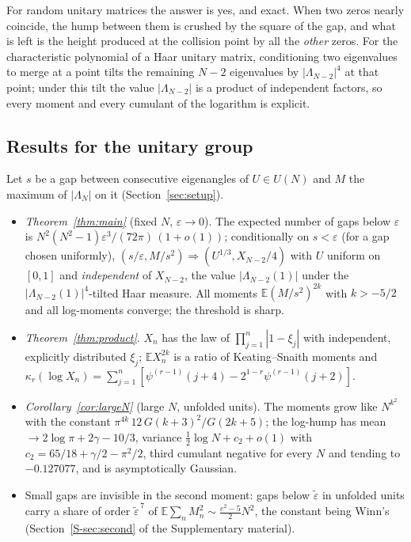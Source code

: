 \documentclass[12pt]{amsart}
\theoremstyle{remark}
\newcommand{\E}{\mathbb{E}}
\newcommand{\eps}{\varepsilon}
\newcommand{\1}{\mathbf{1}}
\begin{document}
For random unitary matrices the answer is yes, and exact. When two zeros
nearly coincide, the hump between them is crushed by the square of the
gap, and what is left is the height produced at the collision point by all
the \emph{other} zeros. For the characteristic polynomial of a Haar
unitary matrix, conditioning two eigenvalues to merge at a point tilts the
remaining $N-2$ eigenvalues by $|\Lambda_{N-2}|^4$ at that point; under
this tilt the value $|\Lambda_{N-2}|$ is a product of independent factors,
so every moment and every cumulant of the logarithm is explicit.

\subsection*{Results for the unitary group}
Let $s$ be a gap between consecutive eigenangles of $U\in U(N)$ and $M$ the
maximum of $|\Lambda_N|$ on it (Section~\ref{sec:setup}).
\begin{itemize}
\item \emph{Theorem~\ref{thm:main}} (fixed $N$, $\eps\to0$). The expected
number of gaps below $\eps$ is $N^2(N^2-1)\eps^3/(72\pi)\,(1+o(1))$;
conditionally on $s<\eps$ (for a gap chosen uniformly),
$(s/\eps, M/s^2) \Rightarrow (U^{1/3}, X_{N-2}/4)$ with $U$ uniform on
$[0,1]$ and \emph{independent} of $X_{N-2}$, the value $|\Lambda_{N-2}(1)|$
under the $|\Lambda_{N-2}(1)|^4$-tilted Haar measure. All moments
$\E(M/s^2)^{2k}$ with $k>-5/2$ and all log-moments converge; the threshold
is sharp.
\item \emph{Theorem~\ref{thm:product}}. $X_n$ has the law of
$\prod_{j=1}^n|1-\xi_j|$ with independent, explicitly distributed $\xi_j$;
$\E X_n^{2k}$ is a ratio of Keating--Snaith moments and
$\kappa_r(\log X_n)=\sum_{j=1}^n[\psi^{(r-1)}(j+4)-2^{1-r}\psi^{(r-1)}(j+2)]$.
\item \emph{Corollary~\ref{cor:largeN}} (large $N$, unfolded units). The
moments grow like $N^{k^2}$ with the constant
$\pi^{4k}\,12\,G(k+3)^2/G(2k+5)$; the log-hump has mean
$\to2\log\pi+2\gamma-10/3$, variance $\tfrac12\log N+c_2+o(1)$ with
$c_2=65/18+\gamma/2-\pi^2/2$, third cumulant negative for every $N$ and
tending to $-0.127077$, and is asymptotically Gaussian.
\item Small gaps are invisible in the second moment: gaps below
$\tilde\eps$ in unfolded units carry a share of order $\tilde\eps^{\,7}$ of
$\E\sum_nM_n^2\sim\frac{e^2-5}2N^2$, the constant being Winn's
\cite{Win12} (Section~\ref{S-sec:second} of the Supplementary material).
\end{itemize}
\end{document}
